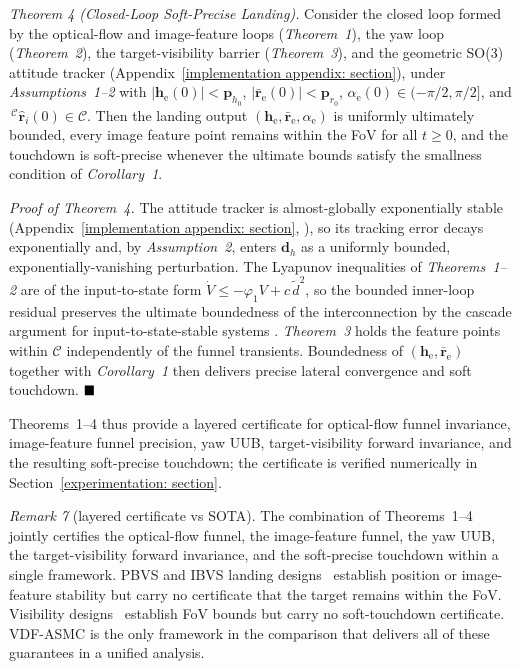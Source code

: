 \documentclass{IEEEtaes}
\begin{document}
\textit{Theorem 4 (Closed-Loop Soft-Precise Landing).} Consider the closed loop formed by the optical-flow and image-feature loops (\textit{Theorem~1}), the yaw loop (\textit{Theorem~2}), the target-visibility barrier (\textit{Theorem~3}), and the geometric SO(3) attitude tracker (Appendix~\ref{implementation appendix: section}), under \textit{Assumptions~1--2} with $|\boldsymbol{h}_\text{e}(0)|<\boldsymbol{p}_{h_0}$, $|\bar{\boldsymbol{r}}_\text{e}(0)|<\boldsymbol{p}_{r_0}$, $\alpha_\text{e}(0)\in(-\pi/2,\pi/2]$, and $\,^\mathcal{C}\hat{\boldsymbol{r}}_i(0)\in\mathcal{C}$. Then the landing output $(\boldsymbol{h}_\text{e},\bar{\boldsymbol{r}}_\text{e},\alpha_\text{e})$ is uniformly ultimately bounded, every image feature point remains within the FoV for all $t\ge 0$, and the touchdown is soft-precise whenever the ultimate bounds satisfy the smallness condition of \textit{Corollary~1}.

\textit{Proof of Theorem~4.} The attitude tracker is almost-globally exponentially stable (Appendix~\ref{implementation appendix: section}, \cite[Thm.~3.1]{lee2010}), so its tracking error decays exponentially and, by \textit{Assumption~2}, enters $\boldsymbol{d}_h$ as a uniformly bounded, exponentially-vanishing perturbation. The Lyapunov inequalities of \textit{Theorems~1--2} are of the input-to-state form $\dot{V}\le-\varphi_1 V+c\,\tilde{d}^2$, so the bounded inner-loop residual preserves the ultimate boundedness of the interconnection by the cascade argument for input-to-state-stable systems \cite{khalil2002}. \textit{Theorem~3} holds the feature points within $\mathcal{C}$ independently of the funnel transients. Boundedness of $(\boldsymbol{h}_\text{e},\bar{\boldsymbol{r}}_\text{e})$ together with \textit{Corollary~1} then delivers precise lateral convergence and soft touchdown. $\hfill\blacksquare$

Theorems~1--4 thus provide a layered certificate for optical-flow funnel invariance, image-feature funnel precision, yaw UUB, target-visibility forward invariance, and the resulting soft-precise touchdown; the certificate is verified numerically in Section~\ref{experimentation: section}.

\textit{Remark 7} (layered certificate vs SOTA). The combination of Theorems~1--4 jointly certifies the optical-flow funnel, the image-feature funnel, the yaw UUB, the target-visibility forward invariance, and the soft-precise touchdown within a single framework. PBVS and IBVS landing designs~\cite{lin2022, zhang2026, cho2022, lin2023} establish position or image-feature stability but carry no certificate that the target remains within the FoV. Visibility designs~\cite{salehi2021, xie2016} establish FoV bounds but carry no soft-touchdown certificate. VDF-ASMC is the only framework in the comparison that delivers all of these guarantees in a unified analysis.
\end{document}
